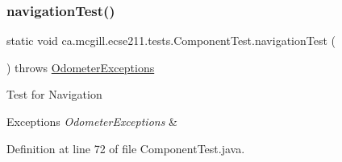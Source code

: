 \subsubsection{\texorpdfstring{navigation\+Test()}{navigationTest()}}
{\footnotesize\ttfamily static void ca.\+mcgill.\+ecse211.\+tests.\+Component\+Test.\+navigation\+Test (\begin{DoxyParamCaption}{ }\end{DoxyParamCaption}) throws \hyperlink{classca_1_1mcgill_1_1ecse211_1_1odometer_1_1_odometer_exceptions}{Odometer\+Exceptions}\hspace{0.3cm}{\ttfamily [static]}}

Test for Navigation


\begin{DoxyExceptions}{Exceptions}
{\em Odometer\+Exceptions} & \\
\hline
\end{DoxyExceptions}


Definition at line 72 of file Component\+Test.\+java.


